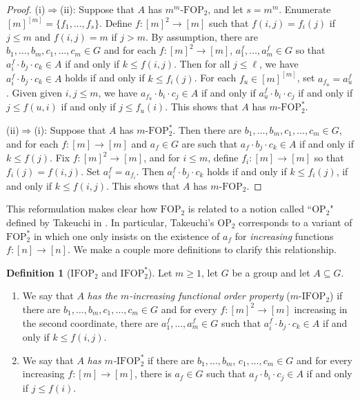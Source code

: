 \documentclass[12pt,oneside,british,a4wide]{amsart}
\numberwithin{equation}{section}
\theoremstyle{definition}
\newtheorem{definition}[theorem]{Definition}
\def\OP{\mathrm{OP}}
\def\FOP{\mathrm{FOP}}
\def\IFOP{\mathrm{IFOP}}
\begin{document}
\begin{proof}
(i)$\Rightarrow$(ii): Suppose that $A$ has $m^m$-$\FOP_2$, and let $s=m^m$.  Enumerate $[m]^{[m]}=\{f_1,\ldots, f_s\}$. Define $f\colon [m]^2\to [m]$ such that $f(i,j)=f_i(j)$ if $j\leq m$ and $f(i,j)=m$ if $j>m$. By assumption, there are $b_1,\ldots,b_m,c_1,\ldots,c_m\in G$ and for each $f:[m]^2\rightarrow [m]$, $a_1^f,\ldots, a_m^f\in G$ so that $a_i^f\cdot b_j\cdot c_k\in A$ if and only if $k\leq f(i,j)$. Then for all $j\leq \ell$, we have $a^f_i\cdot b_j\cdot c_k\in A$ holds if and only if $k\leq f_i(j)$. For each $f_u\in [m]^{[m]}$, set $a_{f_u}=a^f_u$. Given given $i,j\leq m$, we have $a_{f_u}\cdot b_i\cdot c_j\in A$  if and only if $a^f_u\cdot b_i\cdot c_j$ if and only if $j\leq f(u,i)$ if and only if $j\leq f_u(i)$. This shows that $A$ has $m$-$\FOP^*_2$.

(ii)$\Rightarrow$(i): Suppose that $A$ has $m$-$\FOP_2^*$.  Then there are $b_1,\ldots,b_m,c_1,\ldots,c_m\in G$, and for each $f:[m]\rightarrow [m]$ and $a_f\in G$ are such that $a_f\cdot b_j\cdot c_k\in A$ if and only if $k\leq f(j)$.  Fix $f\colon[m]^2\to[m]$, and for $i\leq m$, define $f_i\colon[m]\to[m]$ so that $f_i(j)=f(i,j)$. Set $a^f_i=a_{f_i}$. Then $a^f_i\cdot b_j\cdot c_k$ holds if and only if $k\leq f_i(j)$, if and only if $k\leq f(i,j)$. This shows that $A$ has $m$-$\FOP_2$.
\end{proof}

This reformulation makes clear how $\FOP_2$ is related to a notion called ``$\OP_2$" defined by Takeuchi in \cite{Takeuchi.2018}.  In particular, Takeuchi's $\OP_2$ corresponds to a variant of $\FOP_2^*$ in which one only insists on the existence of $a_f$ for \emph{increasing} functions $f:[n]\rightarrow [n]$.  We make a couple more definitions to clarify this relationship. 

\begin{definition}[$\IFOP_2$ and $\IFOP_2^*$]\label{def:ifop}
Let $m\geq 1$, let $G$ be a group and let $A\subseteq G$. 
\begin{enumerate}
\item We say that $A$ \emph{has the $m$-increasing functional order property} ($m$-$\text{IFOP}_2$) if there are $b_1,\ldots,b_m,c_1,\ldots,c_m\in G$ and for every $f:[m]^2\rightarrow [m]$ increasing in the second coordinate, there are  $a_1^f,\ldots, a_m^f\in G$ such that  $a_i^f\cdot b_j\cdot c_k\in A$ if and only if $k\leq f(i,j)$.
\item We say that $A$ \emph{has $m$-$\mathrm{IFOP}^*_2$} if there are $b_1,\ldots,b_m$, $c_1,\ldots,c_m\in G$ and for every increasing $f:[m]\rightarrow [m]$, there is $a_f\in G$ such that  $a_f\cdot b_i\cdot c_j\in A$ if and only if $j\leq f(i)$.
\end{enumerate}
\end{definition}
\end{document}
